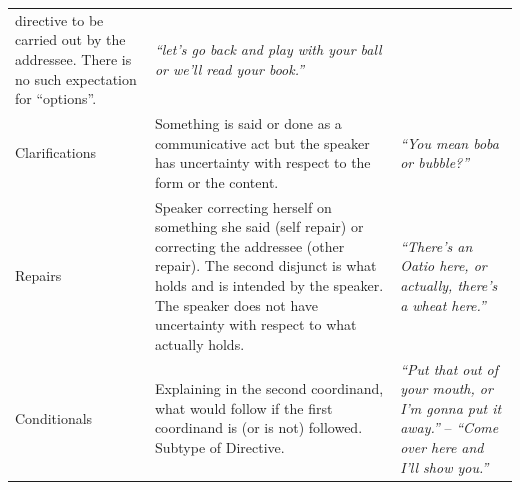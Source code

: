 \documentclass[floatsintext,man]{apa6}
\theoremstyle{definition}
\theoremstyle{definition}
\theoremstyle{definition}
\theoremstyle{remark}
\begin{document}
\begin{longtable}[]{@{}lll@{}}
\begin{minipage}[t]{0.44\columnwidth}
directive to be carried out by the addressee. There is no such
expectation for \enquote{options}.\strut
\end{minipage} & \begin{minipage}[t]{0.33\columnwidth}\raggedright\strut
\emph{\enquote{let's go back and play with your ball or we'll read your
book.}}\strut
\end{minipage}\tabularnewline
\begin{minipage}[t]{0.14\columnwidth}\raggedright\strut
Clarifications\strut
\end{minipage} & \begin{minipage}[t]{0.44\columnwidth}\raggedright\strut
Something is said or done as a communicative act but the speaker has
uncertainty with respect to the form or the content.\strut
\end{minipage} & \begin{minipage}[t]{0.33\columnwidth}\raggedright\strut
\emph{\enquote{You mean boba or bubble?}}\strut
\end{minipage}\tabularnewline
\begin{minipage}[t]{0.14\columnwidth}\raggedright\strut
Repairs\strut
\end{minipage} & \begin{minipage}[t]{0.44\columnwidth}\raggedright\strut
Speaker correcting herself on something she said (self repair) or
correcting the addressee (other repair). The second disjunct is what
holds and is intended by the speaker. The speaker does not have
uncertainty with respect to what actually holds.\strut
\end{minipage} & \begin{minipage}[t]{0.33\columnwidth}\raggedright\strut
\emph{\enquote{There's an Oatio here, or actually, there's a wheat
here.}}\strut
\end{minipage}\tabularnewline
\begin{minipage}[t]{0.14\columnwidth}\raggedright\strut
Conditionals\strut
\end{minipage} & \begin{minipage}[t]{0.44\columnwidth}\raggedright\strut
Explaining in the second coordinand, what would follow if the first
coordinand is (or is not) followed. Subtype of Directive.\strut
\end{minipage} & \begin{minipage}[t]{0.33\columnwidth}\raggedright\strut
\emph{\enquote{Put that out of your mouth, or I'm gonna put it away.}}
-- \emph{\enquote{Come over here and I'll show you.}}\strut
\end{minipage}\tabularnewline

\end{longtable}
\end{document}
